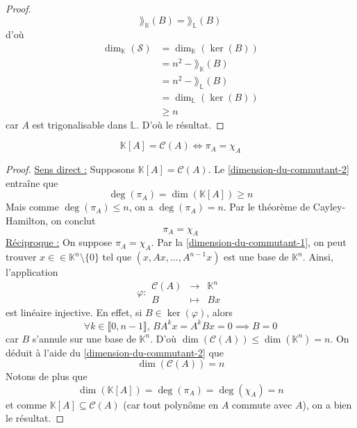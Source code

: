 \begin{proof}
		\[ \rang_{\mathbb{K}}(B) = \rang_{\mathbb{L}}(B) \]
		d'où
		\begin{align*}
			\dim_{\mathbb{K}}(\mathcal{S}) &= \dim_{\mathbb{K}}(\ker(B)) \\
			&= n^2 - \rang_{\mathbb{K}}(B) \\
			&= n^2 - \rang_{\mathbb{L}}(B) \\
			&= \dim_{\mathbb{L}}(\ker(B)) \\
			&\geq n
		\end{align*}
		car $A$ est trigonalisable dans $\mathbb{L}$. D'où le résultat.
	\end{proof}

	\begin{theorem}
		\[ \mathbb{K}[A] = \mathcal{C}(A) \iff \pi_A = \chi_A \]
	\end{theorem}

	\begin{proof}
		\uline{Sens direct :} Supposons $\mathbb{K}[A] = \mathcal{C}(A)$. Le \cref{dimension-du-commutant-2} entraîne que
		\[ \deg(\pi_A) = \dim(\mathbb{K}[A]) \geq n \]
		Mais comme $\deg(\pi_A) \leq n$, on a $\deg(\pi_A) = n$. Par le théorème de Cayley-Hamilton, on conclut
		\[ \pi_A = \chi_A \]
		\uline{Réciproque :} On suppose $\pi_A = \chi_A$. Par la \cref{dimension-du-commutant-1}, on peut trouver $x \in \in \mathbb{K}^n \setminus \{ 0 \}$ tel que $(x, Ax, \dots, A^{n-1}x)$ est une base de $\mathbb{K}^n$. Ainsi, l'application
		\[ \varphi :
		\begin{array}{ccc}
			\mathcal{C}(A) &\rightarrow& \mathbb{K}^n \\
			B &\mapsto& Bx
		\end{array}
		\]
		est linéaire injective. En effet, si $B \in \ker(\varphi)$, alors
		\[ \forall k \in \llbracket 0, n-1 \rrbracket, \, BA^kx = A^kBx = 0 \implies B = 0 \]
		car $B$ s'annule sur une base de $\mathbb{K}^n$. D'où $\dim(\mathcal{C}(A)) \leq \dim(\mathbb{K}^n) = n$. On déduit à l'aide du \cref{dimension-du-commutant-2} que
		\[ \dim(\mathcal{C}(A)) = n \]
		Notons de plus que
		\[ \dim(\mathbb{K}[A]) = \deg(\pi_A) = \deg(\chi_A) = n \]
		et comme $\mathbb{K}[A] \subseteq \mathcal{C}(A)$ (car tout polynôme en $A$ commute avec $A$), on a bien le résultat.
	\end{proof}

